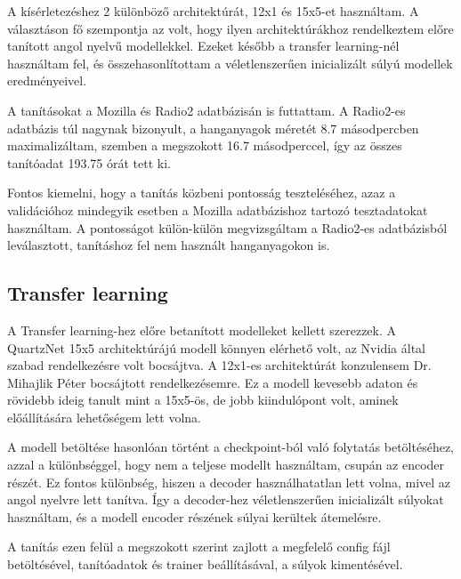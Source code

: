 A kísérletezéshez 2 különböző architektúrát, 12x1 és 15x5-et használtam. A választáson fő szempontja az volt, hogy ilyen architektúrákhoz rendelkeztem előre tanított angol nyelvű modellekkel. Ezeket később a transfer learning-nél használtam fel, és összehasonlítottam a véletlenszerűen inicializált súlyú modellek eredményeivel.

A tanításokat a Mozilla és Radio2 adatbázisán is futtattam. A Radio2-es adatbázis túl nagynak bizonyult, a hanganyagok méretét 8.7 másodpercben maximalizáltam, szemben a megszokott 16.7 másodperccel, így az összes tanítóadat 193.75 órát tett ki.

Fontos kiemelni, hogy a tanítás közbeni pontosság teszteléséhez, azaz a validációhoz mindegyik esetben a Mozilla adatbázishoz tartozó tesztadatokat használtam. A pontosságot külön-külön megvizsgáltam a Radio2-es adatbázisból leválasztott, tanításhoz fel nem használt hanganyagokon is.

\subsection{Transfer learning}

A Transfer learning-hez előre betanított modelleket kellett szerezzek. A QuartzNet 15x5 architektúrájú modell könnyen elérhető volt, az Nvidia által szabad rendelkezésre volt bocsájtva. A 12x1-es architektúrát konzulensem Dr. Mihajlik Péter bocsájtott rendelkezésemre. Ez a modell kevesebb adaton és rövidebb ideig tanult mint a 15x5-ös, de jobb kiindulópont volt, aminek előállítására lehetőségem lett volna.

A modell betöltése hasonlóan történt a checkpoint-ból való folytatás betöltéséhez, azzal a különbséggel, hogy nem a teljese modellt használtam, csupán az encoder részét. Ez fontos különbség, hiszen a decoder használhatatlan lett volna, mivel az angol nyelvre lett tanítva. Így a decoder-hez véletlenszerűen inicializált súlyokat használtam, és a modell encoder részének súlyai kerültek átemelésre.

A tanítás ezen felül a megszokott szerint zajlott a megfelelő config fájl betöltésével, tanítóadatok és trainer beállításával, a súlyok kimentésével.